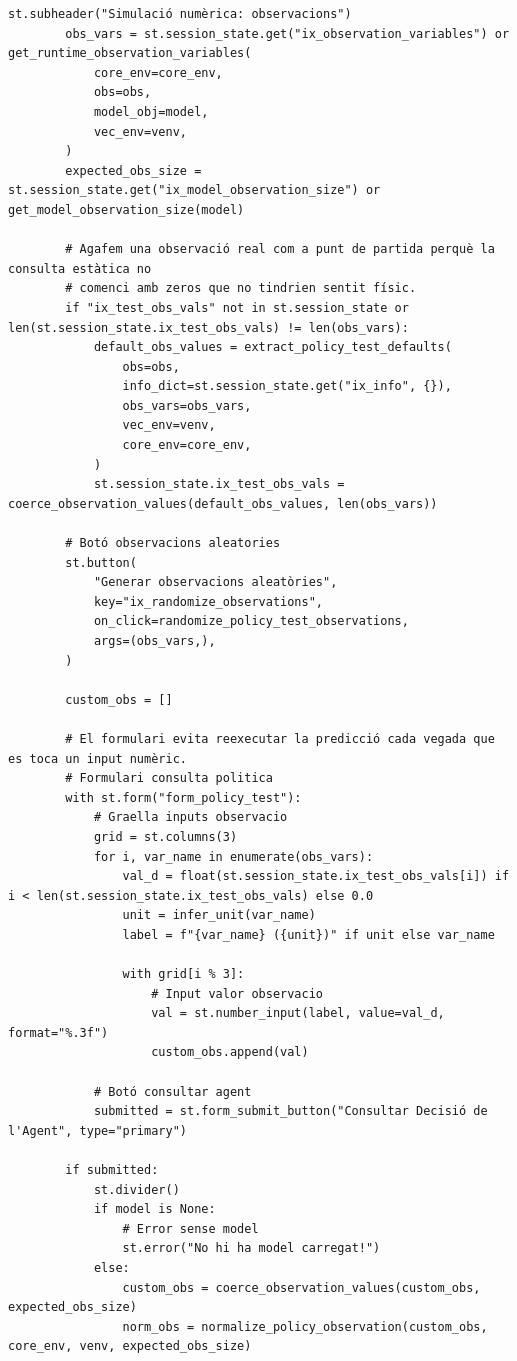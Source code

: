 \documentclass[10pt,a4paper]{article}
\begin{document}
\begin{lstlisting}[style=studioPython,caption={pages/Interaccionar\_amb\_l'Agent.py},label={lst:pages-interaccionar-amb-l-agent-py}]
        st.subheader("Simulació numèrica: observacions")
        obs_vars = st.session_state.get("ix_observation_variables") or get_runtime_observation_variables(
            core_env=core_env,
            obs=obs,
            model_obj=model,
            vec_env=venv,
        )
        expected_obs_size = st.session_state.get("ix_model_observation_size") or get_model_observation_size(model)

        # Agafem una observació real com a punt de partida perquè la consulta estàtica no
        # comenci amb zeros que no tindrien sentit físic.
        if "ix_test_obs_vals" not in st.session_state or len(st.session_state.ix_test_obs_vals) != len(obs_vars):
            default_obs_values = extract_policy_test_defaults(
                obs=obs,
                info_dict=st.session_state.get("ix_info", {}),
                obs_vars=obs_vars,
                vec_env=venv,
                core_env=core_env,
            )
            st.session_state.ix_test_obs_vals = coerce_observation_values(default_obs_values, len(obs_vars))

        # Botó observacions aleatories
        st.button(
            "Generar observacions aleatòries",
            key="ix_randomize_observations",
            on_click=randomize_policy_test_observations,
            args=(obs_vars,),
        )

        custom_obs = []

        # El formulari evita reexecutar la predicció cada vegada que es toca un input numèric.
        # Formulari consulta politica
        with st.form("form_policy_test"):
            # Graella inputs observacio
            grid = st.columns(3)
            for i, var_name in enumerate(obs_vars):
                val_d = float(st.session_state.ix_test_obs_vals[i]) if i < len(st.session_state.ix_test_obs_vals) else 0.0
                unit = infer_unit(var_name)
                label = f"{var_name} ({unit})" if unit else var_name

                with grid[i % 3]:
                    # Input valor observacio
                    val = st.number_input(label, value=val_d, format="%.3f")
                    custom_obs.append(val)

            # Botó consultar agent
            submitted = st.form_submit_button("Consultar Decisió de l'Agent", type="primary")

        if submitted:
            st.divider()
            if model is None:
                # Error sense model
                st.error("No hi ha model carregat!")
            else:
                custom_obs = coerce_observation_values(custom_obs, expected_obs_size)
                norm_obs = normalize_policy_observation(custom_obs, core_env, venv, expected_obs_size)


\end{lstlisting}
\end{document}
